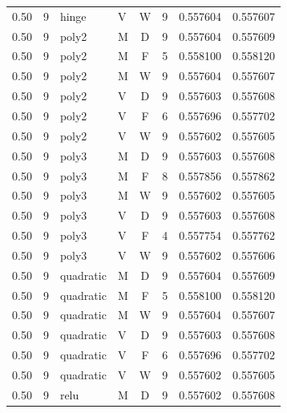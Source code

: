 \begin{longtable}{rrllcrrr}
0.50 & 9 & hinge & V & W & 9 & 0.557604 & 0.557607 \\

0.50 & 9 & poly2 & M & D & 9 & 0.557604 & 0.557609 \\

0.50 & 9 & poly2 & M & F & 5 & 0.558100 & 0.558120 \\

0.50 & 9 & poly2 & M & W & 9 & 0.557604 & 0.557607 \\

0.50 & 9 & poly2 & V & D & 9 & 0.557603 & 0.557608 \\

0.50 & 9 & poly2 & V & F & 6 & 0.557696 & 0.557702 \\

0.50 & 9 & poly2 & V & W & 9 & 0.557602 & 0.557605 \\

0.50 & 9 & poly3 & M & D & 9 & 0.557603 & 0.557608 \\

0.50 & 9 & poly3 & M & F & 8 & 0.557856 & 0.557862 \\

0.50 & 9 & poly3 & M & W & 9 & 0.557602 & 0.557605 \\

0.50 & 9 & poly3 & V & D & 9 & 0.557603 & 0.557608 \\

0.50 & 9 & poly3 & V & F & 4 & 0.557754 & 0.557762 \\

0.50 & 9 & poly3 & V & W & 9 & 0.557602 & 0.557606 \\

0.50 & 9 & quadratic & M & D & 9 & 0.557604 & 0.557609 \\

0.50 & 9 & quadratic & M & F & 5 & 0.558100 & 0.558120 \\

0.50 & 9 & quadratic & M & W & 9 & 0.557604 & 0.557607 \\

0.50 & 9 & quadratic & V & D & 9 & 0.557603 & 0.557608 \\

0.50 & 9 & quadratic & V & F & 6 & 0.557696 & 0.557702 \\

0.50 & 9 & quadratic & V & W & 9 & 0.557602 & 0.557605 \\

0.50 & 9 & relu & M & D & 9 & 0.557602 & 0.557608 \\


\end{longtable}
